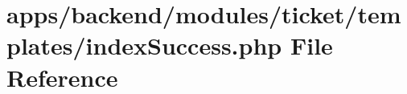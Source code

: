\hypertarget{backend_2modules_2ticket_2templates_2index_success_8php}{\section{apps/backend/modules/ticket/templates/index\-Success.php File Reference}
\label{backend_2modules_2ticket_2templates_2index_success_8php}
}
